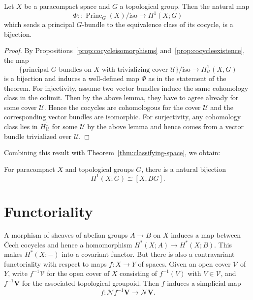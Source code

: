 \documentclass[a4paper,openany]{scrbook}
\DeclareMathOperator{\Princ}{Princ}
\newcommand{\nerve}{\mathcal N}
\begin{document}
\begin{thm}\label{thm:principalbundlesbycechcohomology}
Let $X$ be a paracompact space and $G$ a topological group. Then the natural map
\[
\Phi\colon\colon \Princ_G(X)/\text{iso} \to H^1(X;G)
\]
which sends a principal $G$-bundle to the equivalence class of its cocycle, is a bijection.
\end{thm}
\begin{proof}
By Propositions~\ref{prop:cocycleisomorphisms} and~\ref{prop:cocycleexistence}, the map
\[
\{\text{principal $G$-bundles on $X$ with trivializing cover $\mathcal U$}\}/\text{iso} \to H_\mathcal U^1(X,G)
\]
is a bijection and induces a well-defined map $\Phi$ as in the statement of the theorem. For injectivity, assume two vector bundles induce the same cohomology class in the colimit. Then by the above lemma, they have to agree already for some cover $\mathcal U$. Hence the cocycles are cohomologous for the cover $\mathcal U$ and the corresponding vector bundles are isomorphic. For surjectivity, any cohomology class lies in $H^1_{\mathcal U}$ for some $\mathcal U$ by the above lemma and hence comes from a vector bundle trivialized over $\mathcal U$.
\end{proof}

Combining this result with Theorem~\ref{thm:classifying-space}, we obtain:

\begin{corollary}\label{cor:H1representable}
For paracompact $X$ and topological groups $G$, there is a natural bijection
\[
H^1(X;G) \cong [X,BG].
\]
\end{corollary}

\section{Functoriality}

A morphism of sheaves of abelian groups $A \to B$ on $X$ induces a map between \v Cech cocycles and hence a homomorphism $H^*(X;A) \to H^*(X;B)$. This makes $H^*(X;-)$ into a covariant functor. But there is also a contravariant functoriality with respect to maps $f\colon X \to Y$ of spaces. Given an open cover $\mathcal V$ of $Y$, write $f^{-1}\mathcal V$ for the open cover of $X$ consisting of $f^{-1}(V)$ with $V \in \mathcal V$, and $f^{-1}\mathbf V$ for the associated topological groupoid. Then $f$ induces a simplicial map
\[
f\colon\nerve f^{-1}\mathbf V \to \nerve \mathbf V.
\]
\end{document}
